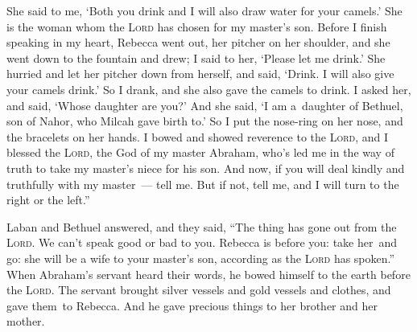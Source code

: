 \begin{inparaenum}
     She said to me, `Both you drink and I will also draw water for your camels.' She is the woman whom the \textsc{Lord} has chosen for my master's son.%
     Before I finish speaking in my heart, Rebecca went out, her pitcher on her shoulder, and she went down to the fountain and drew; I said to her, `Please let me drink.'%
     She hurried and let her pitcher down from herself, and said, `Drink. I will also give your camels drink.' So I drank, and she also gave the camels to drink.%
     I asked her, and said, `Whose daughter are you?' And she said, `I am a\understood\ daughter of Bethuel, son of Nahor, who Milcah gave birth to.' So I put the nose-ring on her nose, and the bracelets on her hands.%
     I bowed and showed reverence to the \textsc{Lord}, and I blessed the \textsc{Lord}, the God of my master Abraham, who's led me in the way of truth to take my master's niece for his son.%
     And now, if you will deal kindly and truthfully with my master~--- tell me. But if not, tell me, and I will turn to the right or the left.''%
    
     Laban and Bethuel answered, and they said, ``The thing has gone out from the \textsc{Lord}. We can't speak good or bad to you.%
     Rebecca is before you: take her\understood\ and go: she will be a wife to your master's son, according as the \textsc{Lord} has spoken.''%
     When Abraham's servant heard their words, he bowed himself to the earth before the \textsc{Lord}.%
     The servant brought silver vessels and gold vessels and clothes, and gave them\understood\ to Rebecca. And he gave precious things to her brother and her mother.%
     \smallskip%
    
    \pvdb{}{}%
    
    \pvdb{}{}%
    
\end{inparaenum}
